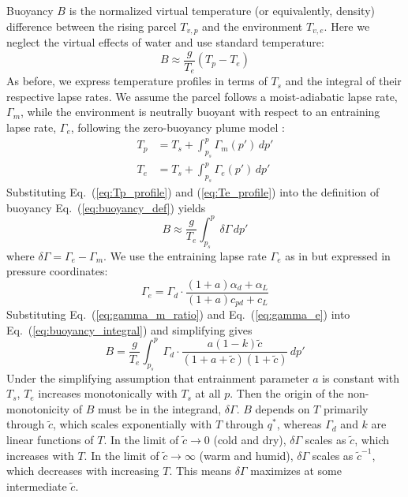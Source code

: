 \documentclass[draft]{ametsocV6.1}
\begin{document}
Buoyancy $B$ is the normalized virtual temperature (or equivalently, density) difference between the rising parcel $T_{v,p}$ and the environment $T_{v,e}$. Here we neglect the virtual effects of water and use standard temperature:
\begin{equation}
B\approx\frac{g}{T_e}(T_p-T_e) \label{eq:buoyancy_def}
\end{equation}
As before, we express temperature profiles in terms of $T_s$ and the integral of their respective lapse rates. We assume the parcel follows a moist-adiabatic lapse rate, $\Gamma_m$, while the environment is neutrally buoyant with respect to an entraining lapse rate, $\Gamma_e$, following the zero-buoyancy plume model \citep{singh2013}:
\begin{align}
T_p&=T_s+\int_{p_s}^p \Gamma_m(p') \, dp' \label{eq:Tp_profile} \\
T_e&=T_s+\int_{p_s}^p \Gamma_e(p') \, dp' \label{eq:Te_profile}
\end{align}
Substituting Eq.~(\ref{eq:Tp_profile}) and (\ref{eq:Te_profile}) into the definition of buoyancy Eq.~(\ref{eq:buoyancy_def}) yields
\begin{equation}
B\approx\frac{g}{T_e}\int_{p_s}^p \delta \Gamma \, dp' \label{eq:buoyancy_integral}
\end{equation}
where $\delta\Gamma = \Gamma_e - \Gamma_m$. We use the entraining lapse rate $\Gamma_e$ as in \cite{romps2016} but expressed in pressure coordinates:
\begin{equation}
\Gamma_e = \Gamma_d \cdot \frac{(1+a)\alpha_d + \alpha_L}{(1+a)c_{pd}+c_L} \label{eq:gamma_e}
\end{equation}
Substituting Eq.~(\ref{eq:gamma_m_ratio}) and Eq.~(\ref{eq:gamma_e}) into Eq.~(\ref{eq:buoyancy_integral}) and simplifying gives
\begin{equation}
    B = \frac{g}{T_e}\int_{p_s}^p \Gamma_d \cdot \frac{a(1-k)\tilde{c}}{(1+a+\tilde{c})(1+\tilde{c})} \, dp' \label{eq:buoyancy_final}
\end{equation}
Under the simplifying assumption that entrainment parameter $a$ is constant with $T_s$, $T_e$ increases monotonically with $T_s$ at all $p$. Then the origin of the non-monotonicity of $B$ must be in the integrand, $\delta \Gamma$. $B$ depends on $T$ primarily through $\tilde{c}$, which scales exponentially with $T$ through $q^*$, whereas $\Gamma_d$ and $k$ are linear functions of $T$. In the limit of $\tilde{c} \to 0$ (cold and dry), $\delta\Gamma$ scales as $\tilde{c}$, which increases with $T$. In the limit of $\tilde{c} \to \infty$ (warm and humid), $\delta\Gamma$ scales as $\tilde{c}^{-1}$, which decreases with increasing $T$. This means $\delta \Gamma$ maximizes at some intermediate $\tilde{c}$.
\end{document}
